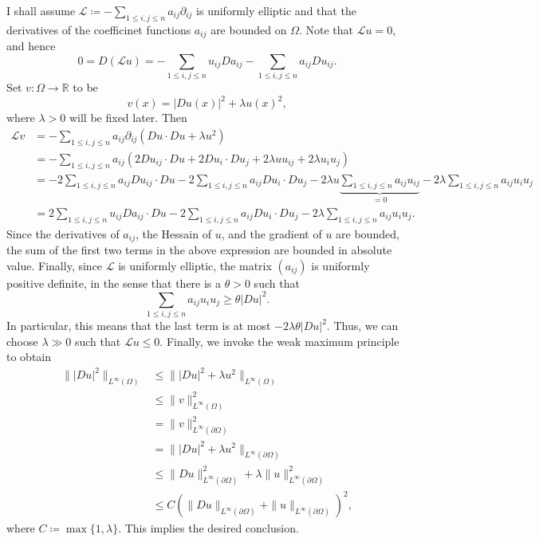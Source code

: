 \documentclass[10pt]{amsart}
\theoremstyle{thmstyle}
\theoremstyle{defstyle}
\newcommand{\R}{\mathbb{R}}
\renewcommand{\le}{\leqslant}
\renewcommand{\ge}{\geqslant}
\newcommand{\scrL}{\mathscr{L}}
\begin{document}
I shall assume $\displaystyle\mathscr{L}\coloneq - \sum_{1\le i,j\le n} a_{ij}\partial_{ij}$ is uniformly elliptic and that the derivatives of the coefficinet functions $a_{ij}$ are bounded on $\Omega$. Note that $\scrL u = 0$, and hence
\begin{equation*}
    0 = D\left(\scrL u\right) = -\sum_{1\le i,j\le n} u_{ij}Da_{ij} - \sum_{1\le i,j\le n} a_{ij}Du_{ij}.
\end{equation*}
Set $v: \Omega\to\R$ to be 
\begin{equation*}
    v(x) = |Du(x)|^2 + \lambda u(x)^2,
\end{equation*}
where $\lambda > 0$ will be fixed later. Then 
\begin{align*}
    \scrL v&= -\sum_{1\le i,j \le n}a_{ij}\partial_{ij}\left(Du\cdot Du + \lambda u^2\right)\\
    &= -\sum_{1\le i,j\le n}a_{ij}\left(2Du_{ij}\cdot Du + 2Du_i\cdot Du_j + 2\lambda uu_{ij} + 2\lambda u_iu_j\right)\\
    &= -2\sum_{1\le i,j\le n} a_{ij}Du_{ij}\cdot Du - 2\sum_{1\le i,j\le n}a_{ij} Du_i\cdot Du_j - 2\lambda u\underbrace{\sum_{1\le i,j\le n}a_{ij}u_{ij}}_{ = 0} - 2\lambda\sum_{1\le i,j\le n}a_{ij}u_iu_j\\
    &= 2\sum_{1\le i,j\le n} u_{ij}Da_{ij}\cdot Du - 2\sum_{1\le i,j\le n}a_{ij}Du_i\cdot Du_j - 2\lambda\sum_{1\le i,j\le n}a_{ij}u_iu_j.
\end{align*}
Since the derivatives of $a_{ij}$, the Hessain of $u$, and the gradient of $u$ are bounded, the sum of the first two terms in the above expression are bounded in absolute value. Finally, since $\scrL$ is uniformly elliptic, the matrix $\left(a_{ij}\right)$ is uniformly positive definite, in the sense that there is a $\theta > 0$ such that 
\begin{equation*}
    \sum_{1\le i,j\le n}a_{ij}u_iu_j\ge\theta|Du|^2.
\end{equation*}
In particular, this means that the last term is at most $-2\lambda\theta|Du|^2$. Thus, we can choose $\lambda\gg 0$ such that $\scrL u\le 0$. Finally, we invoke the weak maximum principle to obtain 
\begin{align*}
    \||Du|^2\|_{L^\infty(\Omega)}&\le \||Du|^2 + \lambda u^2\|_{L^\infty(\Omega)}\\
    &\le \|v\|_{L^\infty(\Omega)}^2\\
    &=\|v\|_{L^\infty(\partial\Omega)}^2\\
    &=\||Du|^2 + \lambda u^2\|_{L^\infty(\partial\Omega)}\\
    &\le\|Du\|_{L^\infty(\partial\Omega)}^2 + \lambda\|u\|_{L^\infty(\partial\Omega)}^2\\
    &\le C\left(\|Du\|_{L^\infty(\partial\Omega)} + \|u\|_{L^\infty(\partial\Omega)}\right)^2,
\end{align*}
where $C\coloneq\max\{1, \lambda\}$. This implies the desired conclusion.
\end{document}

